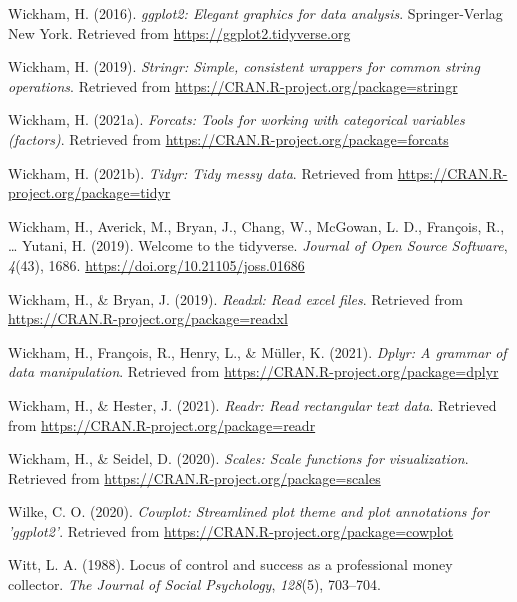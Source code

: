 \documentclass[
  man]{apa6}
\newlength{\cslhangindent}
\newlength{\cslentryspacingunit} %
\newenvironment{CSLReferences}[2] %
 {%
  \setlength{\parindent}{0pt}
  \ifodd #1
  \let\oldpar\par
  \def\par{\hangindent=\cslhangindent\oldpar}
  \fi
  \setlength{\parskip}{#2\cslentryspacingunit}
 }%
 {}
\begin{document}
\begin{CSLReferences}{1}{0}
\leavevmode{}%
Wickham, H. (2016). \emph{ggplot2: Elegant graphics for data analysis}. Springer-Verlag New York. Retrieved from \url{https://ggplot2.tidyverse.org}

\leavevmode{}%
Wickham, H. (2019). \emph{Stringr: Simple, consistent wrappers for common string operations}. Retrieved from \url{https://CRAN.R-project.org/package=stringr}

\leavevmode{}%
Wickham, H. (2021a). \emph{Forcats: Tools for working with categorical variables (factors)}. Retrieved from \url{https://CRAN.R-project.org/package=forcats}

\leavevmode{}%
Wickham, H. (2021b). \emph{Tidyr: Tidy messy data}. Retrieved from \url{https://CRAN.R-project.org/package=tidyr}

\leavevmode{}%
Wickham, H., Averick, M., Bryan, J., Chang, W., McGowan, L. D., François, R., \ldots{} Yutani, H. (2019). Welcome to the {tidyverse}. \emph{Journal of Open Source Software}, \emph{4}(43), 1686. \url{https://doi.org/10.21105/joss.01686}

\leavevmode{}%
Wickham, H., \& Bryan, J. (2019). \emph{Readxl: Read excel files}. Retrieved from \url{https://CRAN.R-project.org/package=readxl}

\leavevmode{}%
Wickham, H., François, R., Henry, L., \& Müller, K. (2021). \emph{Dplyr: A grammar of data manipulation}. Retrieved from \url{https://CRAN.R-project.org/package=dplyr}

\leavevmode{}%
Wickham, H., \& Hester, J. (2021). \emph{Readr: Read rectangular text data}. Retrieved from \url{https://CRAN.R-project.org/package=readr}

\leavevmode{}%
Wickham, H., \& Seidel, D. (2020). \emph{Scales: Scale functions for visualization}. Retrieved from \url{https://CRAN.R-project.org/package=scales}

\leavevmode{}%
Wilke, C. O. (2020). \emph{Cowplot: Streamlined plot theme and plot annotations for 'ggplot2'}. Retrieved from \url{https://CRAN.R-project.org/package=cowplot}

\leavevmode{}%
Witt, L. A. (1988). Locus of control and success as a professional money collector. \emph{The Journal of Social Psychology}, \emph{128}(5), 703--704.


\end{CSLReferences}
\end{document}
